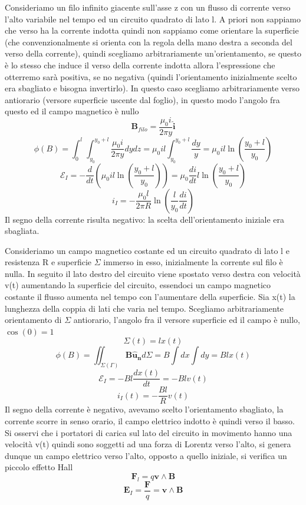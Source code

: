 \documentclass[
10pt, %
a4paper, %
oneside, %
headinclude,footinclude, %
BCOR5mm, %
]{scrartcl}
\begin{document}
\begin{esercizio}
Consideriamo un filo infinito giacente sull'asse z con un flusso di corrente verso l'alto variabile nel tempo ed un circuito quadrato di lato l. A priori non sappiamo che verso ha la corrente indotta quindi non sappiamo come orientare la superficie  (che convenzionalmente si orienta con la regola della mano destra a seconda del verso della corrente), quindi scegliamo arbitrariamente un'orientamento, se questo è lo stesso che induce il verso della corrente indotta allora l'espressione che otterremo sarà positiva, se no negativa (quindi l'orientamento inizialmente scelto era sbagliato e bisogna invertirlo). In questo caso scegliamo arbitrariamente verso antiorario (versore superficie uscente dal foglio), in questo modo l'angolo fra questo ed il campo magnetico è nullo
\[\mathbf{B}_{filo} = \frac{\mu_0 i}{2\pi y}\mathbf{\hat{i}}\]
\[\phi(B)=\int_0^l\int_{y_0}^{y_0+l} \frac{\mu_0 i}{2\pi y}dydz= \mu_0 i l \int_{y_0}^{y_0+l}\frac{dy}{y}=\mu_0 i l \ln\left(\frac{y_0 + l}{y_0}\right)\]
\[\mathcal{E}_I=-\frac{d}{dt}\left(\mu_0 i l \ln\left(\frac{y_0 + l}{y_0}\right)\right) = \mu_0 \frac{di}{dt} l \ln\left(\frac{y_0 + l}{y_0}\right)\]
\[i_I = -\frac{\mu_0 l}{2\pi R}\ln\left(\frac{l}{y_0}\frac{di}{dt}\right)\]
Il segno della corrente risulta negativo: la scelta dell'orientamento iniziale era sbagliata. 
\end{esercizio}
\begin{esercizio}
Consideriamo un campo magnetico costante ed un circuito quadrato di lato l e resistenza R e superficie $\Sigma$ immerso in esso, inizialmente la corrente sul filo è nulla. In seguito il lato destro del circuito viene spostato verso destra con velocità v(t) aumentando la superficie del circuito, essendoci un campo magnetico costante il flusso aumenta nel tempo con l'aumentare della superficie. Sia x(t) la lunghezza della coppia di lati che varia nel tempo. Scegliamo arbitrariamente orientamento di \(\Sigma\) antiorario, l'angolo fra il versore superficie ed il campo è nullo, \(\cos(0)= 1\)
\[\Sigma(t) = l x(t)\] 
\[\phi(B) = \iint_{\Sigma(\Gamma)}\mathbf{B}\mathbf{\hat{u}_n}d\Sigma = B\int dx\int dy = Blx(t)\]
\[\mathcal{E}_I = -Bl\frac{dx(t)}{dt} = -Blv(t)\]
\[i_I(t) = -\frac{Bl}{R}v(t)\]
Il segno della corrente è negativo, avevamo scelto l'orientamento sbagliato, la corrente scorre in senso orario, il campo elettrico indotto è quindi verso il basso.\\
Si osservi che i portatori di carica sul lato del circuito in movimento hanno una velocità v(t) quindi sono soggetti ad una forza di Lorentz verso l'alto, si genera dunque un campo elettrico verso l'alto, opposto a quello iniziale, si verifica un piccolo effetto Hall
\[\mathbf{F}_l = q \mathbf{v}\wedge\mathbf{B}\]
\[\mathbf{E}_I=\frac{\mathbf{F}}{q} = \mathbf{v}\wedge\mathbf{B}\]
\end{esercizio}
\end{document}
